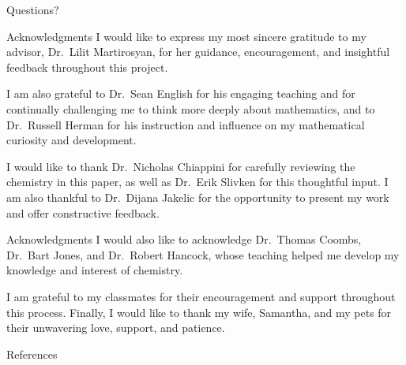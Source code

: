 \documentclass{beamer}
\newcommand{\vs}{\vspace{5mm}}
\begin{document}
    \begin{frame}{Questions?}
    
    \end{frame}

    \begin{frame}{Acknowledgments}
        I would like to express my most sincere gratitude to my advisor, Dr.\ Lilit Martirosyan, for her guidance, encouragement, and insightful feedback throughout this project.
        \vs

        I am also grateful to Dr.\ Sean English for his engaging teaching and for continually challenging me to think more deeply about mathematics, and to Dr.\ Russell Herman for his instruction and influence on my mathematical curiosity and development.
        \vs

        I would like to thank Dr.\ Nicholas Chiappini for carefully reviewing the chemistry in this paper, as well as Dr.\ Erik Slivken for this thoughtful input. I am also thankful to Dr.\ Dijana Jakelic for the opportunity to present my work and offer constructive feedback.
    \end{frame}

    \begin{frame}{Acknowledgments}
        I would also like to acknowledge Dr.\ Thomas Coombs, Dr.\ Bart Jones, and Dr.\ Robert Hancock, whose teaching helped me develop my knowledge and interest of chemistry.
        \vs

        I am grateful to my classmates for their encouragement and support throughout this process. Finally, I would like to thank my wife, Samantha, and my pets for their unwavering love, support, and patience.
    \end{frame}

    \begin{frame}[allowframebreaks]{References}
        \printbibliography[heading=bibnumbered]
    \end{frame}
\end{document}
